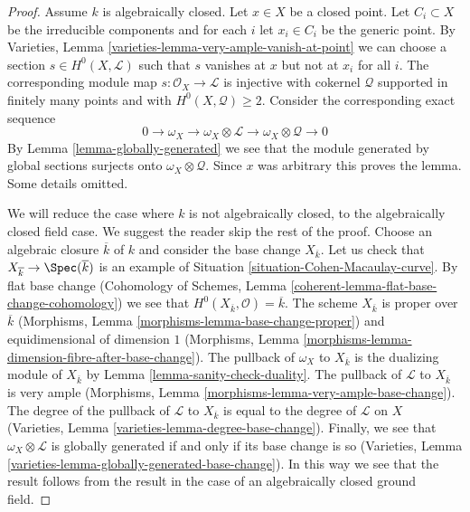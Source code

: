 \begin{proof}
Assume $k$ is algebraically closed. Let $x \in X$ be a closed point.
Let $C_i \subset X$ be the irreducible components and for each $i$
let $x_i \in C_i$ be the generic point. By
Varieties, Lemma \ref{varieties-lemma-very-ample-vanish-at-point}
we can choose a section $s \in H^0(X, \mathcal{L})$ such that $s$
vanishes at $x$ but not at $x_i$ for all $i$. The corresponding
module map $s : \mathcal{O}_X \to \mathcal{L}$ is injective with
cokernel $\mathcal{Q}$ supported in finitely many points and
with $H^0(X, \mathcal{Q}) \geq 2$. Consider the corresponding
exact sequence
$$
0 \to \omega_X \to \omega_X \otimes \mathcal{L} \to
\omega_X \otimes \mathcal{Q} \to 0
$$
By Lemma \ref{lemma-globally-generated} we see that the module generated
by global sections surjects onto $\omega_X \otimes \mathcal{Q}$.
Since $x$ was arbitrary this proves the lemma. Some details omitted.

\medskip\noindent
We will reduce the case where $k$ is not algebraically closed, to
the algebraically closed field case. We suggest the reader skip
the rest of the proof. Choose an algebraic closure $\overline{k}$
of $k$ and consider the base change $X_{\overline{k}}$. Let us
check that $X_{\overline{k}} \to \Spec(\overline{k})$ is an example
of Situation \ref{situation-Cohen-Macaulay-curve}. By flat base change
(Cohomology of Schemes, Lemma \ref{coherent-lemma-flat-base-change-cohomology})
we see that $H^0(X_{\overline{k}}, \mathcal{O}) = \overline{k}$.
The scheme $X_{\overline{k}}$ is proper over $\overline{k}$ (Morphisms,
Lemma \ref{morphisms-lemma-base-change-proper}) and
equidimensional of dimension $1$
(Morphisms, Lemma \ref{morphisms-lemma-dimension-fibre-after-base-change}).
The pullback of $\omega_X$ to $X_{\overline{k}}$ is the dualizing
module of $X_{\overline{k}}$ by Lemma \ref{lemma-sanity-check-duality}.
The pullback of $\mathcal{L}$ to $X_{\overline{k}}$ is very ample
(Morphisms, Lemma \ref{morphisms-lemma-very-ample-base-change}).
The degree of the pullback of $\mathcal{L}$ to $X_{\overline{k}}$
is equal to the degree of $\mathcal{L}$ on $X$ (Varieties, Lemma
\ref{varieties-lemma-degree-base-change}). Finally, we see that
$\omega_X \otimes \mathcal{L}$ is globally generated if and only
if its base change is so
(Varieties, Lemma \ref{varieties-lemma-globally-generated-base-change}).
In this way we see that the result follows from the result in the
case of an algebraically closed ground field.
\end{proof}




